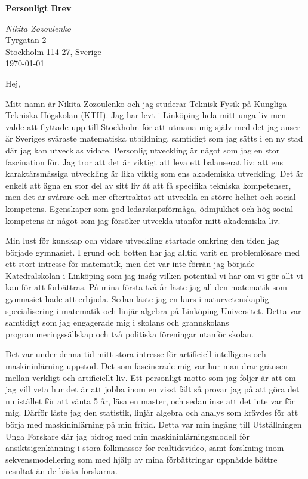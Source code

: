 \documentclass[11pt,a4paper]{article} %
\begin{document}
\begin{center}
\textbf{Personligt Brev}
\end{center}

\begin{flushright}
\textit{Nikita Zozoulenko} \\
Tyrgatan 2\\
Stockholm 114 27, Sverige \\
\today
\end{flushright}
Hej,

Mitt namn är Nikita Zozoulenko och jag studerar Teknisk Fysik på Kungliga Tekniska Högskolan (KTH). Jag har levt i Linköping hela mitt unga liv men valde att flyttade upp till Stockholm för att utmana mig själv med det jag anser är Sveriges svåraste matematiska utbildning, samtidigt som jag sätts i en ny stad där jag kan utvecklas vidare. Personlig utveckling är något som jag en stor fascination för. Jag tror att det är viktigt att leva ett balanserat liv; att ens karaktärsmässiga utveckling är lika viktig som ens akademiska utveckling. Det är enkelt att ägna en stor del av sitt liv åt att få specifika tekniska kompetenser, men det är svårare och mer eftertraktat att utveckla en större helhet och social kompetens. Egenskaper som god ledarskapsförmåga, ödmjukhet och hög social kompetens är något som jag försöker utveckla utanför mitt akademiska liv. 

Min lust för kunskap och vidare utveckling startade omkring den tiden jag började gymnasiet. I grund och botten har jag alltid varit en problemlösare med ett stort intresse för matematik, men det var inte förrän jag började Katedralskolan i Linköping som jag insåg vilken potential vi har om vi gör allt vi kan för att förbättras. På mina första två år läste jag all den matematik som gymnasiet hade att erbjuda. Sedan läste jag en kurs i naturvetenskaplig specialisering i matematik och linjär algebra på Linköping Universitet. Detta var samtidigt som jag engagerade mig i skolans och grannskolans programmeringssällskap och två politiska föreningar utanför skolan. 

Det var under denna tid mitt stora intresse för artificiell intelligens och maskininlärning uppstod. Det som fascinerade mig var hur man drar gränsen mellan verkligt och artificiellt liv. Ett personligt motto som jag följer är att om jag vill veta hur det är att jobba inom en visst fält så provar jag på att göra det nu istället för att vänta 5 år, läsa en master, och sedan inse att det inte var för mig. Därför läste jag den statistik, linjär algebra och analys som krävdes för att börja med maskininlärning på min fritid. Detta var min ingång till Utställningen Unga Forskare där jag bidrog med min maskininlärningsmodell för ansiktsigenkänning i stora folkmassor för realtidsvideo, samt forskning inom sekvensmodellering som med hjälp av mina förbättringar uppnådde bättre resultat än de bästa forskarna.  
\end{document}
